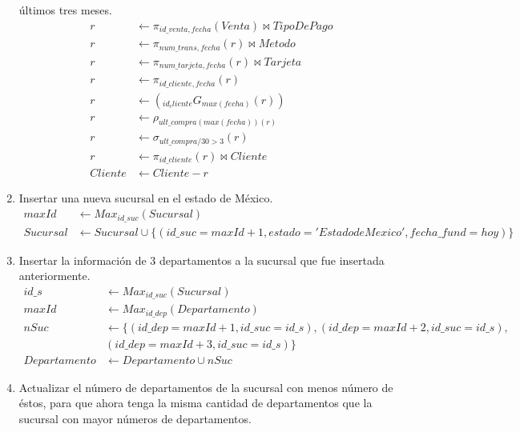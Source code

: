 \documentclass{article}
\begin{document}
\begin{enumerate}
{            últimos tres meses.
            \begin{align*}
                r &\leftarrow \pi_{id\_venta, fecha}(Venta) \bowtie TipoDePago \\
                r &\leftarrow \pi_{num\_trans, fecha}(r) \bowtie Metodo \\
                r &\leftarrow \pi_{num\_tarjeta, fecha}(r) \bowtie Tarjeta \\
                r &\leftarrow \pi_{id\_cliente, fecha}(r) \\
                r &\leftarrow (_{id_cliente}G_{max(fecha)}(r)) \\
                r &\leftarrow \rho_{ult\_compra(max(fecha))(r)} \\
                r &\leftarrow \sigma_{ult\_compra/30 > 3}(r) \\
                r &\leftarrow \pi_{id\_cliente}(r) \bowtie Cliente \\
                Cliente &\leftarrow Cliente - r
            \end{align*}
        }
        \item {
            Insertar una nueva sucursal en el estado de México.
            \begin{align*}
                maxId &\leftarrow Max_{id\_suc}(Sucursal)\\
                Sucursal &\leftarrow Sucursal 
                \cup \{(id\_suc = maxId+1, estado='Estado de Mexico', 
                fecha\_fund = hoy)\}
            \end{align*}
        }
        \item {
            Insertar la información de 3 departamentos a la sucursal que fue
            insertada anteriormente.
            \begin{align*}
                id\_s &\leftarrow Max_{id\_suc}(Sucursal)\\
                maxId &\leftarrow Max_{id\_dep}(Departamento)\\
                nSuc &\leftarrow \{(id\_dep = maxId+1, id\_suc=id\_s),
                (id\_dep = maxId+2, id\_suc=id\_s),\\
                &(id\_dep = maxId+3, id\_suc=id\_s)\}\\
                Departamento &\leftarrow Departamento \cup nSuc
            \end{align*}
        }
        \item {
            Actualizar el número de departamentos de la sucursal con menos
            número de éstos, para que ahora tenga la misma cantidad de departamentos
            que la sucursal con mayor números de departamentos.
        }
    \end{enumerate}
\end{document}
